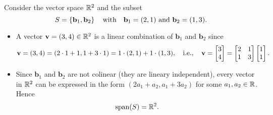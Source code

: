 \documentclass[11pt,openany]{article}
\renewcommand{\vec}[1]{\mathbf{#1}}
\begin{document}
\begin{example*}
Consider the vector space $\mathbb{R}^2$ and the subset \[
S=\set{\vec{b}_1,\vec{b}_2}\quad\text{with}\quad \vec{b}_1=(2,1)\ \text{and}\ \vec{b}_2=(1,3).
\] 
\begin{center}
\end{center}
\begin{itemize}
	\item A vector $\vec{v}=(3,4)\in\R^2$ is a linear combination of $\vec{b}_1$ and $\vec{b}_2$ since \[
	\vec{v}=(3,4)=(2\cdot 1+1,1+3\cdot 1)=1\cdot(2,1)+1\cdot(1,3),\quad\ie,\quad\vec{v}=\begin{bmatrix}
		3\\ 4
	\end{bmatrix}=\begin{bmatrix}
	2 & 1 \\ 1 & 3
\end{bmatrix}\begin{bmatrix}
1\\ 1
\end{bmatrix}.
	\]
	\item Since $\vec{b}_1$ and $\vec{b}_2$ are not colinear (they are lineary independent), every vector in $\mathbb{R}^2$ can be expressed in the form $(2a_1+a_2,a_1+3a_2)$ for some $a_1,a_2\in\mathbb{R}$. Hence \[
	\operatorname{\normalfont span}(S)=\mathbb{R}^2.
	\]
\end{itemize}
\end{example*}
\end{document}
